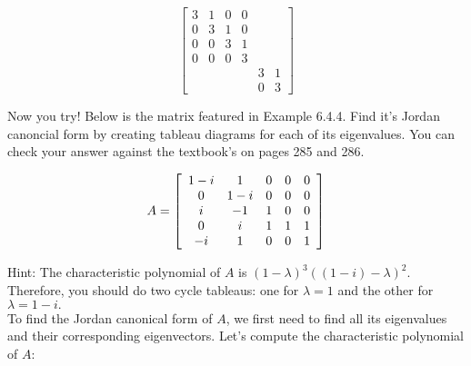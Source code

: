 \documentclass[fontsize=12pt]{scrartcl}
\begin{document}
$$\begin{bmatrix} 3 & 1 & 0 & 0\\
0 & 3 & 1 & 0\\
0 & 0 & 3 & 1\\
0 & 0 & 0 & 3\\
  & & & & 3 & 1 \\
  & & & & 0 & 3
  \end{bmatrix}
$$

\bigskip

\noindent
Now you try! Below is the matrix featured in Example 6.4.4. Find it's Jordan canoncial form by creating tableau diagrams for each of its eigenvalues. You can check your answer against the textbook's on pages 285 and 286.

$$A = \left[ \begin{array}{c c c c c} 1-i & 1 & 0 & 0 & 0 \\
0 & 1-i & 0 & 0 & 0 \\
i & -1 & 1 & 0 & 0\\
0 & i & 1 & 1 & 1\\
-i & 1 & 0 & 0 & 1
\end{array} \right]$$

\bigskip

\noindent
Hint: The characteristic polynomial of $A$ is $(1-\lambda)^3((1-i)-\lambda )^2. $ Therefore, you should do two cycle tableaus: one for $\lambda = 1$ and the other for $\lambda = 1-i.$\\

To find the Jordan canonical form of $A$, we first need to find all its eigenvalues and their corresponding eigenvectors. Let's compute the characteristic polynomial of $A$:
\end{document}
